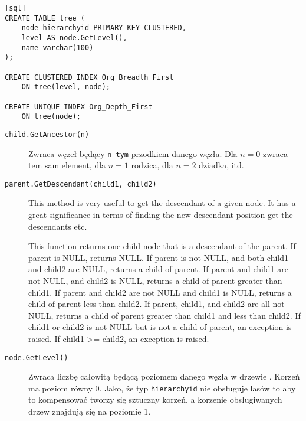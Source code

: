 \begin{verbatim}[sql]
CREATE TABLE tree (
    node hierarchyid PRIMARY KEY CLUSTERED,
    level AS node.GetLevel(),
    name varchar(100)
);

CREATE CLUSTERED INDEX Org_Breadth_First
    ON tree(level, node);

CREATE UNIQUE INDEX Org_Depth_First
    ON tree(node);
\end{verbatim}



\begin{description}
  \item[\texttt{child.GetAncestor(n)}] 
    Zwraca węzeł będący \texttt{n-tym} przodkiem danego węzła.
    Dla $n = 0$ zwraca tem sam element, dla $n = 1$ rodzica, dla $n = 2$ dziadka, itd.

  \item[\texttt{parent.GetDescendant(child1, child2)}] 
	This method is very useful to get the descendant of a given node. 
	It has a great significance in terms of finding the new descendant position get the descendants etc. 

	This function returns one child node that is a descendant of the parent. 
	If parent is NULL, returns NULL. 
	If parent is not NULL, and both child1 and child2 are NULL, returns a child of parent. 
	If parent and child1 are not NULL, and child2 is NULL, returns a child of parent greater than child1. 
	If parent and child2 are not NULL and child1 is NULL, returns a child of parent less than child2. 
	If parent, child1, and child2 are all not NULL, returns a child of parent greater than child1 and less than child2. 
	If child1 or child2 is not NULL but is not a child of parent, an exception is raised. 
	If child1 >= child2, an exception is raised.

  \item[\texttt{node.GetLevel()}] 
	Zwraca liczbę całowitą będącą poziomem danego węzła w drzewie . 
	Korzeń ma poziom równy $0$. 
	Jako, że typ \texttt{hierarchyid} nie obsługuje lasów to aby to kompensować tworzy się sztuczny korzeń, a korzenie obsługiwanych drzew znajdują się na poziomie $1$.



\end{description}
